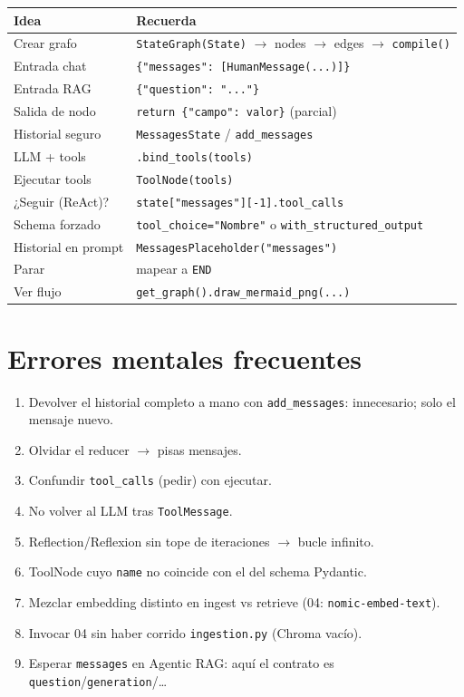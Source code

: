 \documentclass[11pt,a4paper]{article}
\begin{document}
\begin{center}
\begin{tabular}{@{}p{5.0cm}p{10.2cm}@{}}
\toprule
\textbf{Idea} & \textbf{Recuerda} \\
\midrule
Crear grafo & \texttt{StateGraph(State)} $\to$ nodes $\to$ edges $\to$ \texttt{compile()} \\
Entrada chat & \texttt{\{"messages": [HumanMessage(...)]\}} \\
Entrada RAG & \texttt{\{"question": "..."\}} \\
Salida de nodo & \texttt{return \{"campo": valor\}} (parcial) \\
Historial seguro & \texttt{MessagesState} / \texttt{add\_messages} \\
LLM + tools & \texttt{.bind\_tools(tools)} \\
Ejecutar tools & \texttt{ToolNode(tools)} \\
¿Seguir (ReAct)? & \texttt{state["messages"][-1].tool\_calls} \\
Schema forzado & \texttt{tool\_choice="Nombre"} o \texttt{with\_structured\_output} \\
Historial en prompt & \texttt{MessagesPlaceholder("messages")} \\
Parar & mapear a \texttt{END} \\
Ver flujo & \texttt{get\_graph().draw\_mermaid\_png(...)} \\
\bottomrule
\end{tabular}
\end{center}

\section{Errores mentales frecuentes}
\label{sec:pitfalls}

\begin{enumerate}[leftmargin=*,itemsep=2pt]
  \item Devolver el historial completo a mano con \texttt{add\_messages}: innecesario; solo el mensaje nuevo.
  \item Olvidar el reducer $\to$ pisas mensajes.
  \item Confundir \texttt{tool\_calls} (pedir) con ejecutar.
  \item No volver al LLM tras \texttt{ToolMessage}.
  \item Reflection/Reflexion sin tope de iteraciones $\to$ bucle infinito.
  \item ToolNode cuyo \texttt{name} no coincide con el del schema Pydantic.
  \item Mezclar embedding distinto en ingest vs retrieve (04: \texttt{nomic-embed-text}).
  \item Invocar 04 sin haber corrido \texttt{ingestion.py} (Chroma vacío).
  \item Esperar \texttt{messages} en Agentic RAG: aquí el contrato es \texttt{question}/\texttt{generation}/\ldots
\end{enumerate}
\end{document}
